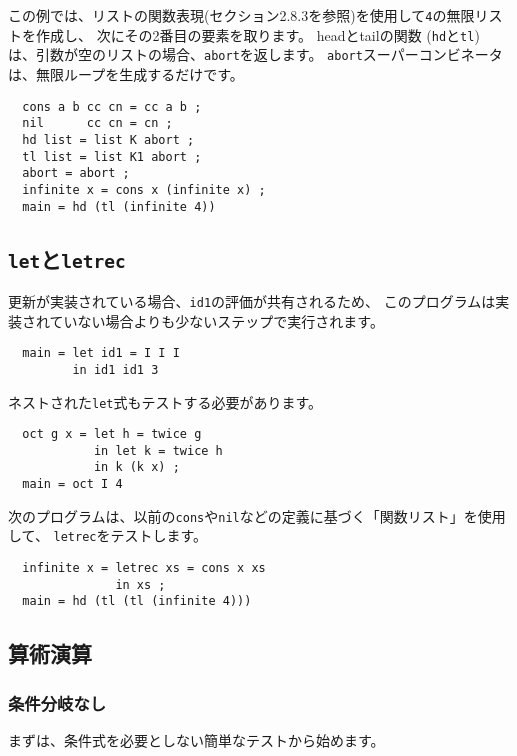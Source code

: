 \documentclass{jarticle}
\begin{document}
この例では、リストの関数表現(セクション2.8.3を参照)を使用して\texttt{4}の無限リストを作成し、
次にその2番目の要素を取ります。
headとtailの関数 (\texttt{hd}と\texttt{tl}) は、引数が空のリストの場合、\texttt{abort}を返します。
\texttt{abort}スーパーコンビネータは、無限ループを生成するだけです。

\begin{verbatim}
  cons a b cc cn = cc a b ;
  nil      cc cn = cn ;
  hd list = list K abort ;
  tl list = list K1 abort ;
  abort = abort ;
  infinite x = cons x (infinite x) ;
  main = hd (tl (infinite 4))
\end{verbatim}

\subsection{\texttt{let}と\texttt{letrec}}

更新が実装されている場合、\texttt{id1}の評価が共有されるため、
このプログラムは実装されていない場合よりも少ないステップで実行されます。

\begin{verbatim}
  main = let id1 = I I I
         in id1 id1 3
\end{verbatim}

ネストされた\texttt{let}式もテストする必要があります。

\begin{verbatim}
  oct g x = let h = twice g
            in let k = twice h
            in k (k x) ;
  main = oct I 4
\end{verbatim}

次のプログラムは、以前の\texttt{cons}や\texttt{nil}などの定義に基づく「関数リスト」を使用して、
\texttt{letrec}をテストします。

\begin{verbatim}
  infinite x = letrec xs = cons x xs
               in xs ;
  main = hd (tl (tl (infinite 4)))
\end{verbatim}

\subsection{算術演算}

\subsubsection{条件分岐なし}

まずは、条件式を必要としない簡単なテストから始めます。
\end{document}
